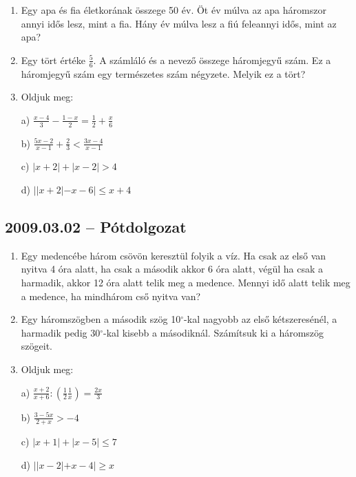 \begin{enumerate}
 
\item Egy apa és fia életkorának összege 50 év. Öt év múlva az apa háromszor annyi idős lesz, mint a fia. Hány év múlva lesz a fiú feleannyi idős, mint az apa?
 
\item Egy tört értéke $\frac{5}{6}$. A számláló és a nevező összege háromjegyű szám. Ez a háromjegyű szám egy természetes szám négyzete. Melyik ez a tört?
 
\item Oldjuk meg:
 
a) $\displaystyle{\frac{x-4}{3}}-\displaystyle{\frac{1-x}{2}} = \displaystyle{\frac{1}{2}}+\displaystyle{\frac{x}{6}}$
 
b) $\displaystyle{\frac{5x-2}{x-1}}+\displaystyle{\frac{2}{3}}<\displaystyle{\frac{3x-4}{x-1}}$
 
c) $|x+2|+|x-2|>4$
 
d) $||x+2|-x-6|\le x+4$
 
\end{enumerate}
 
\subsection*{2009.03.02 -- Pótdolgozat}
 
\begin{enumerate}
 
\item Egy medencébe három csövön keresztül folyik a víz. Ha csak az első van nyitva 4 óra alatt, ha csak a második akkor 6 óra alatt, végül ha csak a harmadik, akkor 12 óra alatt telik meg a medence. Mennyi idő alatt telik meg a medence, ha mindhárom cső nyitva van?
 
\item Egy háromszögben a második szög 10$^{\circ}$-kal nagyobb az első kétszeresénél, a harmadik pedig 30$^{\circ}$-kal kisebb a másodiknál. Számítsuk ki a háromszög szögeit.
 
\item Oldjuk meg:
 
a) $\displaystyle{\frac{x+2}{x+6}}:\left(\displaystyle{\frac{1}{2}}\displaystyle{\frac{1}{x}}\right)=\displaystyle{\frac{2x}{3}}$
 
b) $\displaystyle{\frac{3-5x}{2+x}}>-4$
 
c) $|x+1|+|x-5|\le 7$
 
d) $||x-2|+x-4|\ge x$
 
\end{enumerate}
 
